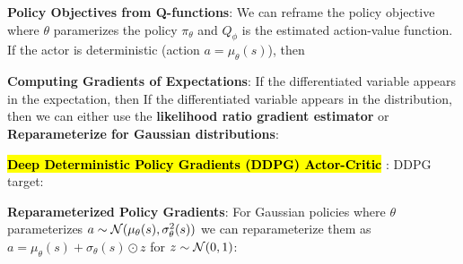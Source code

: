 \documentclass{article}
\begin{document}
  \textbf{Policy Objectives from Q-functions}: We can reframe the policy objective
  where $\theta$ paramerizes the policy $\pi_\theta$ and $Q_\phi$ is the estimated action-value function. If the actor is deterministic (action $a=\mu_\theta(s)$), then

  \textbf{Computing Gradients of Expectations}: If the differentiated variable appears in the expectation, then
  If the differentiated variable appears in the distribution, then we can either use the \textbf{likelihood ratio gradient estimator}
  or \textbf{Reparameterize for Gaussian distributions}: 

  \hl{\textbf{Deep Deterministic Policy Gradients (DDPG) Actor-Critic}} \cite{lillicrap2016continuous}: DDPG target:

  \textbf{Reparameterized Policy Gradients}: For Gaussian policies where $\theta$ parameterizes $a\sim\mathcal{N}(\mu_\theta(s),\sigma^2_\theta(s))$ we can reparameterize them as $a=\mu_\theta(s)+\sigma_\theta(s)\odot z$ for $z\sim\mathcal{N}(0,1)$: 
\end{document}
